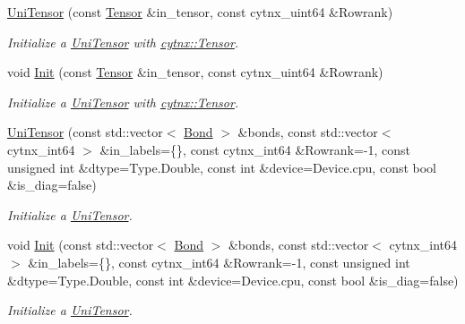 \textbf{ }\par
\begin{DoxyCompactItemize}
\item 
\hyperlink{classcytnx_1_1UniTensor_a7a5b9286ae4bc1ef5afa00105f222a13}{Uni\+Tensor} (const \hyperlink{classcytnx_1_1Tensor}{Tensor} \&in\+\_\+tensor, const cytnx\+\_\+uint64 \&Rowrank)
\begin{DoxyCompactList}\small\item\em Initialize a \hyperlink{classcytnx_1_1UniTensor}{Uni\+Tensor} with \hyperlink{classcytnx_1_1Tensor}{cytnx\+::\+Tensor}. \end{DoxyCompactList}\item 
void \hyperlink{classcytnx_1_1UniTensor_ae94c74dc715d1ed3aa409a894d4dddfb}{Init} (const \hyperlink{classcytnx_1_1Tensor}{Tensor} \&in\+\_\+tensor, const cytnx\+\_\+uint64 \&Rowrank)
\begin{DoxyCompactList}\small\item\em Initialize a \hyperlink{classcytnx_1_1UniTensor}{Uni\+Tensor} with \hyperlink{classcytnx_1_1Tensor}{cytnx\+::\+Tensor}. \end{DoxyCompactList}\end{DoxyCompactItemize}

\textbf{ }\par
\begin{DoxyCompactItemize}
\item 
\hyperlink{classcytnx_1_1UniTensor_acc305e7b7767843bd282a9c2cc49114c}{Uni\+Tensor} (const std\+::vector$<$ \hyperlink{classcytnx_1_1Bond}{Bond} $>$ \&bonds, const std\+::vector$<$ cytnx\+\_\+int64 $>$ \&in\+\_\+labels=\{\}, const cytnx\+\_\+int64 \&Rowrank=-\/1, const unsigned int \&dtype=Type.\+Double, const int \&device=Device.\+cpu, const bool \&is\+\_\+diag=false)
\begin{DoxyCompactList}\small\item\em Initialize a \hyperlink{classcytnx_1_1UniTensor}{Uni\+Tensor}. \end{DoxyCompactList}\item 
void \hyperlink{classcytnx_1_1UniTensor_ad6ba5c7452b4d83bfbaa9770060f8a63}{Init} (const std\+::vector$<$ \hyperlink{classcytnx_1_1Bond}{Bond} $>$ \&bonds, const std\+::vector$<$ cytnx\+\_\+int64 $>$ \&in\+\_\+labels=\{\}, const cytnx\+\_\+int64 \&Rowrank=-\/1, const unsigned int \&dtype=Type.\+Double, const int \&device=Device.\+cpu, const bool \&is\+\_\+diag=false)
\begin{DoxyCompactList}\small\item\em Initialize a \hyperlink{classcytnx_1_1UniTensor}{Uni\+Tensor}. \end{DoxyCompactList}\end{DoxyCompactItemize}



